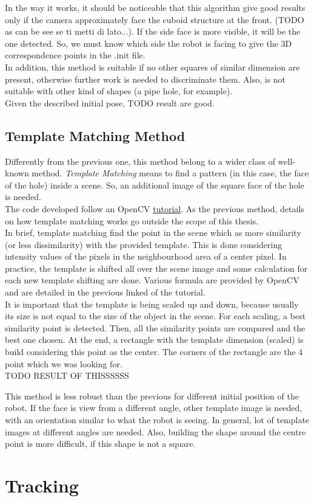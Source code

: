In the way it works, it should be noticeable that this algorithm give good results only if the camera approximately face the cuboid structure at the front. (TODO as can be see se ti metti di lato...). If the side face is more visible, it will be the one detected. So, we must know which side the robot is facing to give the 3D correspondence points in the .init file.\\
In addition, this method is suitable if no other squares of similar dimension are present, otherwise further work is needed to discriminate them. Also, is not suitable with other kind of shapes (a pipe hole, for example).\\
Given the described initial pose, TODO result are good.


\subsection{Template Matching Method}
Differently from the previous one, this method belong to a wider class of well-known method. \textit{Template Matching} means to find a pattern (in this case, the face of the hole) inside a scene. So, an additional image of the square face of the hole is needed.\\
The code developed follow an OpenCV \href{https://docs.opencv.org/3.4.6/de/da9/tutorial_template_matching.html}{tutorial}. As the previous method, details on how template matching works go outside the scope of this thesis.\\
In brief, template matching find the point in the scene which as more similarity (or less dissimilarity) with the provided template. This is done considering intensity values of the pixels in the neighbourhood area of a center pixel. In practice, the template is shifted all over the scene image and some calculation for each new template shifting are done. Various formula are provided by OpenCV and are detailed in the previous linked of the tutorial.\\
It is important that the template is being scaled up and down, because usually its size is not equal to the size of the object in the scene. For each scaling, a best similarity point is detected. Then, all the similarity points are compared and the best one chosen.  At the end, a rectangle with the template dimension (scaled) is build considering this point as the center. The corners of the rectangle are the 4 point which we was looking for.\\

TODO RESULT OF THISSSSSS

This method is less robust than the previous for different initial position of the robot. If the face is view from a different angle, other template image is needed, with an orientation similar to what the robot is seeing. In general, lot of template images at different angles are needed. Also, building the shape around the centre point is more difficult, if this shape is not a square.





\section{Tracking}
\label{sec:visTracking}
